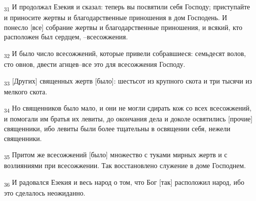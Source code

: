 \begin{tcolorbox}
\textsubscript{31} И продолжал Езекия и сказал: теперь вы посвятили себя Господу; приступайте и приносите жертвы и благодарственные приношения в дом Господень. И понесло [все] собрание жертвы и благодарственные приношения, и всякий, кто расположен был сердцем, --всесожжения.
\end{tcolorbox}
\begin{tcolorbox}
\textsubscript{32} И было число всесожжений, которые привели собравшиеся: семьдесят волов, сто овнов, двести агнцев--все это для всесожжения Господу.
\end{tcolorbox}
\begin{tcolorbox}
\textsubscript{33} [Других] священных жертв [было]: шестьсот из крупного скота и три тысячи из мелкого скота.
\end{tcolorbox}
\begin{tcolorbox}
\textsubscript{34} Но священников было мало, и они не могли сдирать кож со всех всесожжений, и помогали им братья их левиты, до окончания дела и доколе освятились [прочие] священники, ибо левиты были более тщательны в освящении себя, нежели священники.
\end{tcolorbox}
\begin{tcolorbox}
\textsubscript{35} Притом же всесожжений [было] множество с туками мирных жертв и с возлияниями при всесожжении. Так восстановлено служение в доме Господнем.
\end{tcolorbox}
\begin{tcolorbox}
\textsubscript{36} И радовался Езекия и весь народ о том, что Бог [так] расположил народ, ибо это сделалось неожиданно.
\end{tcolorbox}
